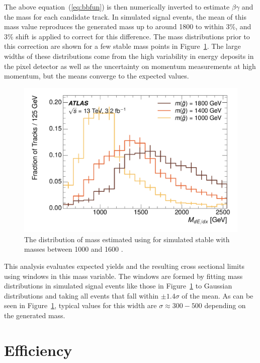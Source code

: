 The above equation~(\ref{eq:bbfun}) is then numerically inverted to estimate $\beta\gamma$ and the mass for each candidate track.
In simulated signal events, the mean of this mass value reproduces the generated mass up to around 1800 \GeV to within 3\%, and 3\% shift is applied to correct for this difference.
The mass distributions prior to this correction are shown for a few stable mass points in Figure~\ref{fig:mass_dedx}.
The large widths of these distributions come from the high variability in energy deposits in the pixel detector as well as the uncertainty on momentum measurements at high momentum, but the means converge to the expected values.

\begin{figure}
\centering
\includegraphics[width=\fullfig]{figures/mass_dedx.pdf}
\caption{The distribution of mass estimated using \dedx for simulated stable \rhadrons with masses between 1000 and 1600 \GeV.}
\label{fig:mass_dedx}
\end{figure}

This analysis evaluates expected yields and the resulting cross sectional limits using windows in this mass variable.
The windows are formed by fitting mass distributions in simulated signal events like those in Figure~\ref{fig:mass_dedx} to Gaussian distributions and taking all events that fall within $\pm 1.4 \sigma$ of the mean.
As can be seen in Figure~\ref{fig:mass_dedx}, typical values for this width are $\sigma \approx 300-500$ \GeV depending on the generated mass.

\section{Efficiency}
\label{sec:efficiency}

